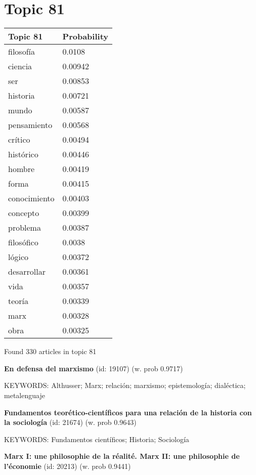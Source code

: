 \documentclass{article}
\begin{document}
\centering
\thispagestyle{empty}
\section*{Topic 81}\vfill
\begin{tabular}{ll}
\toprule
     Topic 81 & Probability \\
\midrule
    filosofía &      0.0108 \\
      ciencia &     0.00942 \\
          ser &     0.00853 \\
     historia &     0.00721 \\
        mundo &     0.00587 \\
  pensamiento &     0.00568 \\
      crítico &     0.00494 \\
    histórico &     0.00446 \\
       hombre &     0.00419 \\
        forma &     0.00415 \\
 conocimiento &     0.00403 \\
     concepto &     0.00399 \\
     problema &     0.00387 \\
   filosófico &      0.0038 \\
       lógico &     0.00372 \\
  desarrollar &     0.00361 \\
         vida &     0.00357 \\
       teoría &     0.00339 \\
         marx &     0.00328 \\
         obra &     0.00325 \\
\bottomrule
\end{tabular}

\vfill
Found 330 articles in topic 81
\vfill

\textbf{En defensa del marxismo} (id: 19107)
 (w. prob 0.9717)


KEYWORDS:
Althusser; Marx; relación; marxismo; epistemología; dialéctica; metalenguaje
\vfill

\textbf{Fundamentos teorético-científicos para una relación de la historia con la sociología} (id: 21674)
 (w. prob 0.9643)


KEYWORDS:
Fundamentos científicos; Historia; Sociología
\vfill

\textbf{Marx I: une philosophie de la réalité. Marx II: une philosophie de l'économie} (id: 20213)
 (w. prob 0.9441)
\end{document}
